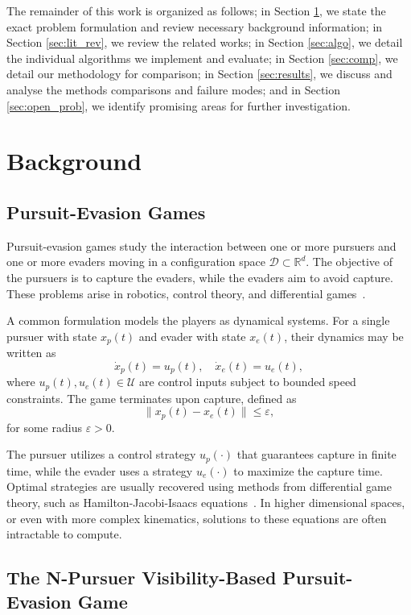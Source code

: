 \documentclass[conference]{IEEEtran}
\begin{document}
The remainder of this work is organized as follows; in Section \ref{sec:background}, we state the exact problem formulation and review necessary background information; in Section \ref{sec:lit_rev}, we review the related works; in Section \ref{sec:algo}, we detail the individual algorithms we implement and evaluate; in Section \ref{sec:comp}, we detail our methodology for comparison; in Section \ref{sec:results}, we discuss and analyse the methods comparisons and failure modes; and in Section \ref{sec:open_prob}, we identify promising areas for further investigation.

\section{Background} \label{sec:background}

\subsection{Pursuit-Evasion Games}

Pursuit-evasion games study the interaction between one or more pursuers and one or more evaders moving in a configuration space $\mathcal{D} \subset \mathbb{R}^d$. 
The objective of the pursuers is to capture the evaders, while the evaders aim to avoid capture. 
These problems arise in robotics, control theory, and differential games~\cite{diff_games}.

A common formulation models the players as dynamical systems. 
For a single pursuer with state $x_p(t)$ and evader with state $x_e(t)$, their dynamics may be written as
\[
\dot{x}_p(t) = u_p(t), \quad \dot{x}_e(t) = u_e(t),
\]
where $u_p(t), u_e(t) \in \mathcal{U}$ are control inputs subject to bounded speed constraints. 
The game terminates upon capture, defined as
\[
\|x_p(t) - x_e(t)\| \leq \varepsilon,
\]
for some radius $\varepsilon > 0$.

The pursuer utilizes a control strategy $u_p(\cdot)$ that guarantees capture in finite time, while the evader uses a strategy $u_e(\cdot)$ to maximize the capture time. 
Optimal strategies are usually recovered using methods from differential game theory, such as Hamilton-Jacobi-Isaacs equations~\cite{diff_games}.
In higher dimensional spaces, or even with more complex kinematics, solutions to these equations are often intractable to compute.

\subsection{The N-Pursuer Visibility-Based Pursuit-Evasion Game}
\end{document}
